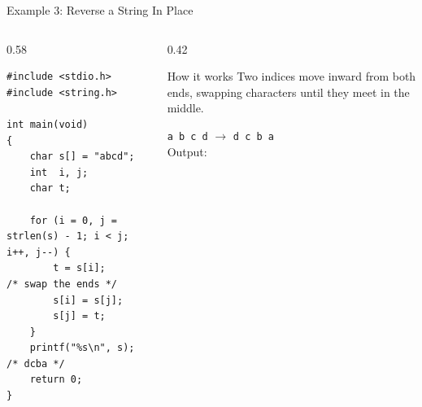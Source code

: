 \documentclass[aspectratio=169]{beamer}
\begin{document}
	\begin{frame}[fragile]{Example 3: Reverse a String In Place}
		\begin{columns}[T]
			\begin{column}{0.58\textwidth}
				\begin{lstlisting}
#include <stdio.h>
#include <string.h>

int main(void)
{
    char s[] = "abcd";
    int  i, j;
    char t;

    for (i = 0, j = strlen(s) - 1; i < j; i++, j--) {
        t = s[i];          /* swap the ends */
        s[i] = s[j];
        s[j] = t;
    }
    printf("%s\n", s);     /* dcba */
    return 0;
}
				\end{lstlisting}
			\end{column}
			\begin{column}{0.42\textwidth}
				\begin{block}{How it works}
					\small Two indices move inward from both ends, swapping characters until they meet
					in the middle.
				\end{block}
				\centering\footnotesize
				\texttt{a b c d} $\rightarrow$ \texttt{d c b a}\\[4pt]
				Output:\; 
			\end{column}
		\end{columns}
	\end{frame}
\end{document}
